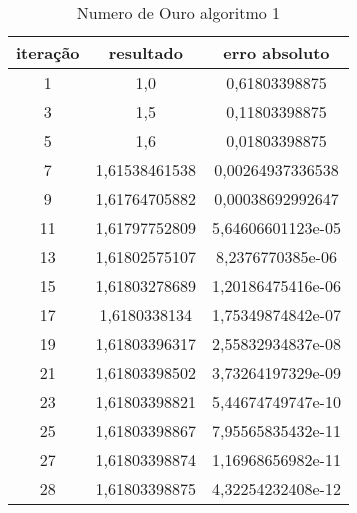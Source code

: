 \documentclass[12pt]{article}
\begin{document}
\begin{table}[ht]
\centering
\caption{Numero de Ouro algoritmo 1}
\vspace{0.1cm}
\begin{tabular}{c|c|c}
\hline   
\hline   
iteração & resultado & erro absoluto \\
\hline   
1 & 1,0 & 0,61803398875 \\
3 & 1,5 & 0,11803398875 \\
5 & 1,6 & 0,01803398875 \\
7 & 1,61538461538 & 0,00264937336538 \\
9 & 1,61764705882 & 0,00038692992647 \\
11 & 1,61797752809 & 5,64606601123e-05 \\
13 & 1,61802575107 & 8,2376770385e-06 \\
15 & 1,61803278689 & 1,20186475416e-06 \\
17 & 1,6180338134 & 1,75349874842e-07 \\
19 & 1,61803396317 & 2,55832934837e-08 \\
21 & 1,61803398502 & 3,73264197329e-09 \\
23 & 1,61803398821 & 5,44674749747e-10 \\
25 & 1,61803398867 & 7,95565835432e-11 \\
27 & 1,61803398874 & 1,16968656982e-11 \\
28 & 1,61803398875 & 4,32254232408e-12 \\
\hline   
\hline   
\end{tabular}
\label{tabouro1}
\end{table} 

\newpage{}
\end{document}
